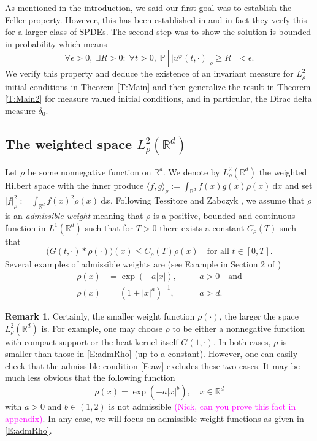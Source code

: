 \documentclass[a4paper,11pt]{article}%
\numberwithin{equation}{section}
\theoremstyle{plain}
\theoremstyle{definition}
\newtheorem{remark}[theorem]{Remark}
\newcommand{\R}{\mathbb{R}}
\newcommand{\ud}{\ensuremath{ \mathrm{d} }}
\begin{document}
As mentioned in the introduction, we said our first goal was to establish the Feller property. However, this has been established in \cite{DZ96} and in fact they verfy this for a larger class of SPDEs. The second step was to show the solution is bounded in probability which means
\begin{equation*}
	\forall \epsilon >0, \; \exists R>0: \; \forall t>0, \; \mathbb{P}\left[|u^\varphi(t,\cdot)|_\rho \ge R\right] <  \epsilon .
\end{equation*}
We verify this property and deduce the existence of an invariant measure for $L^2_\rho$ initial conditions in Theorem
\ref{T:Main} and then generalize the result in Theorem \ref{T:Main2} for measure valued initial conditions, and in particular, the Dirac delta
measure $\delta_0$.

\subsection{The weighted space $L^2_\rho(\R^d)$}\label{S:weightedspace}

Let $\rho$ be some nonnegative function on $\R^d$.
We denote by $L^2_\rho(\R^d)$ the weighted Hilbert space with the inner produce $\langle f,g \rangle_\rho  :=
\int_{\R^d}f(x)g(x)\rho(x) \: \ud x$ and set $|f|_\rho^2 :=\int_{\R^d}f(x)^2\rho(x) \: \ud x$.
Following Tessitore and Zabczyk \cite{TZ98}, we assume that $\rho$ is an \textit{admissible weight}
meaning that $\rho$ is a positive, bounded and continuous function in $L^1(\R^d)$ such that for $T>0$ there exists a
constant $C_\rho(T)$ such that
\begin{equation}
\big(G(t,\cdot)*\rho(\cdot)\big)(x) \le C_\rho(T) \rho(x) \quad \text{for all $t\in[0,T]$.} \label{E:aw}
\end{equation}
Several examples of admissible weights are (see Example in Section 2 of \cite{TZ98})
\begin{equation}
	\label{E:admRho}
	\begin{aligned}
		\rho(x) & = \exp(-a|x|), \quad               &  & a>0 \quad \text{and} \\
		\rho(x) & = \left(1+|x|^a\right)^{-1}, \quad &  & a>d.
	\end{aligned}
\end{equation}

\begin{remark}
	\label{R:admRho}
	Certainly, the smaller weight function $\rho(\cdot)$, the larger the space $L_\rho^2(\R^d)$ is.
	For example, one may choose $\rho$ to be either a nonnegative function with compact support or the
	heat kernel itself $G(1,\cdot)$. In both cases, $\rho$ is smaller than those in \eqref{E:admRho}
	(up to a constant). However, one can easily check that the admissible condition \eqref{E:aw}
	excludes these two cases. It may be much less obvious that the following function
	\begin{equation*}
		\rho(x) = \exp\left(-a |x|^b\right), \quad x\in\R^d
	\end{equation*}
	with $a>0$ and $b\in (1,2)$ is not admissible \textcolor{magenta}{(Nick, can you prove this fact
	in appendix)}. In any case, we will focus on admissible weight functions as given in \eqref{E:admRho}.
\end{remark}
\end{document}
